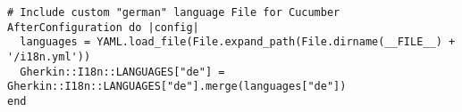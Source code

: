 \begin{lstlisting}[caption=features/support/i18n\_loader.rb]
# Include custom "german" language File for Cucumber
AfterConfiguration do |config|
  languages = YAML.load_file(File.expand_path(File.dirname(__FILE__) + '/i18n.yml'))
  Gherkin::I18n::LANGUAGES["de"] = Gherkin::I18n::LANGUAGES["de"].merge(languages["de"])
end
\end{lstlisting}



\newpage
\listoffigures



\lstlistoflistings
\cite{*} 
%

